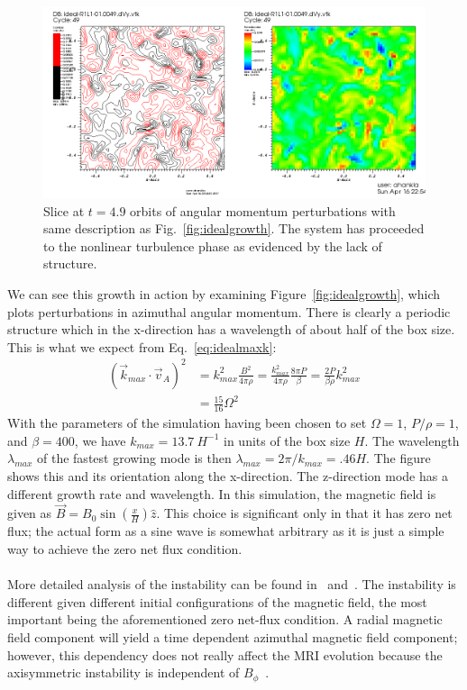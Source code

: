 \begin{figure}
  \begin{center}  
    \includegraphics [width=\textwidth, angle=0.]{img/ideal-R1L1-01-dVy-xz-t49.png}
  \end{center}
  \caption{Slice at $t=4.9$ orbits of angular momentum perturbations with same description as Fig.~\ref{fig:idealgrowth}. The system has proceeded to the nonlinear turbulence phase as evidenced by the lack of structure.}
  \label{fig:idealturb}
\end{figure}
We can see this growth in action by examining Figure~\ref{fig:idealgrowth}, which plots perturbations in azimuthal angular momentum. There is clearly a periodic structure which in the x-direction has a wavelength of about half of the box size. This is what we expect from Eq.~\ref{eq:idealmaxk}:
\begin{align*}
  (\vec k_{max}\cdot \vec v_A)^2&=k_{max}^2\frac{B^2}{4\pi\rho}=\frac{k_{max}^2}{4\pi\rho}\frac{8\pi P}{\beta}=\frac{2P}{\beta\rho}k_{max}^2\\
  &=\frac{15}{16}\Omega^2
\end{align*}
With the parameters of the simulation having been chosen to set $\Omega=1$, $P/\rho=1$, and $\beta=400$, we have $k_{max}=13.7~H^{-1}$ in units of the box size $H$. The wavelength $\lambda_{max}$ of the fastest growing mode is then $\lambda_{max}=2\pi/k_{max}=.46H$. The figure shows this and its orientation along the x-direction. The z-direction mode has a different growth rate and wavelength. In this simulation, the magnetic field is given as $\vec B=B_0\sin\left(\frac xH\right)\hat z$. This choice is significant only in that it has zero net flux; the actual form as a sine wave is somewhat arbitrary as it is just a simple way to achieve the zero net flux condition.\\
\\
More detailed analysis of the instability can be found in~\citet{BH1991a} and~\citet{BH1998}. The instability is different given different initial configurations of the magnetic field, the most important being the aforementioned zero net-flux condition. A radial magnetic field component will yield a time dependent azimuthal magnetic field component; however, this dependency does not really affect the MRI evolution because the axisymmetric instability is independent of $B_\phi$~\cite{BH1998}. \\

